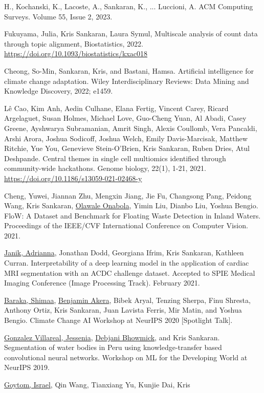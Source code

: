 \documentclass[letterpaper]{article}
\renewenvironment{itemize}{
  \begin{list}{}{
    \setlength{\leftmargin}{1.5em}
  }
}{
  \end{list}
}
\begin{document}
\begin{itemize}
H., Kochanski, K., Lacoste, A., Sankaran, K., ... Luccioni, A. ACM Computing
Surveys. Volume 55, Issue 2, 2023.
\item Fukuyama, Julia, Kris Sankaran, Laura Symul, Multiscale analysis of count
data through topic alignment, Biostatistics, 2022.
\href{https://doi.org/10.1093/biostatistics/kxac018}{https://doi.org/10.1093/biostatistics/kxac018}
\item Cheong, So-Min, Sankaran, Kris, and Bastani, Hamsa. Artificial
intelligence for climate change adaptation. Wiley Interdisciplinary Reviews:
Data Mining and Knowledge Discovery, 2022; e1459.
\item Lê Cao, Kim Anh, Aedin Culhane, Elana Fertig, Vincent Carey, Ricard
  Argelaguet, Susan Holmes, Michael Love, Guo-Cheng Yuan, Al Abadi, Casey
  Greene, Ayshwarya Subramanian, Amrit Singh, Alexis Coullomb, Vera Pancaldi,
  Arshi Arora, Joshua Sodicoff, Joshua Welch, Emily Davis-Marcisak, Matthew
  Ritchie, Yue You, Genevieve Stein-O’Brien, Kris Sankaran, Ruben Dries, Atul
  Deshpande. Central themes in single cell multiomics identified through
  community-wide hackathons. Genome biology, 22(1), 1-21, 2021.
  \href{https://doi.org/10.1186/s13059-021-02468-y}{https://doi.org/10.1186/s13059-021-02468-y}
\item Cheng, Yuwei, Jiannan Zhu, Mengxin Jiang, Jie Fu, Changsong Pang,
Peidong Wang, Kris Sankaran, \underline{Olawale Onabola}, Yimin Liu, Dianbo Liu, Yoshua
Bengio. FloW: A Dataset and Benchmark for Floating Waste Detection in Inland
Waters. Proceedings of the IEEE/CVF International Conference on Computer
Vision. 2021.
\item \underline{Janik, Adrianna}, Jonathan Dodd, Georgiana Ifrim, Kris Sankaran, Kathleen
  Curran. Interpretability of a deep learning model in the application of
  cardiac MRI segmentation with an ACDC challenge dataset. Accepted to SPIE
  Medical Imaging Conference (Image Processing Track). February 2021.
\item \underline{Baraka, Shimaa}, \underline{Benjamin Akera}, Bibek Aryal,
Tenzing Sherpa, Finu Shresta, Anthony Ortiz, Kris Sankaran, Juan Lavista
Ferris, Mir Matin, and Yoshua Bengio. Climate Change AI Workshop at NeurIPS
2020 [Spotlight Talk].
\item \underline{Gonzalez Villareal, Jessenia}, \underline{Debjani Bhowmick},
and Kris Sankaran. Segmentation of water bodies in Peru using
knowledge-transfer based convolutional neural networks. Workshop on ML for the
Developing World at NeurIPS 2019.
\item \underline{Goytom, Israel}, Qin Wang, Tianxiang Yu, Kunjie Dai, Kris

\end{itemize}
\end{document}
